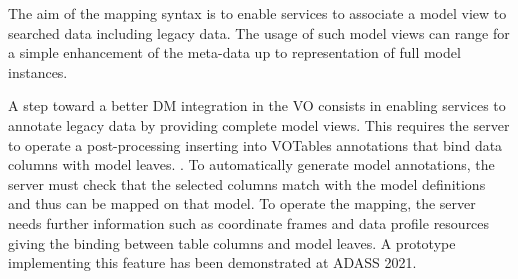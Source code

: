 The aim of the mapping syntax is to enable services to associate a model view to searched data including legacy data.
The usage of such model views can range for a simple enhancement of the meta-data up to representation of full model instances.

A step toward a better DM integration in the VO consists in enabling services to annotate
legacy data by providing complete model
views. This requires the server to operate a post-processing inserting into VOTables
annotations that bind data columns with model leaves. .
To automatically generate model annotations, the server must check that the selected columns 
match with the model definitions and thus can be
mapped on that model. To operate the mapping, the server needs further information
such as coordinate frames and data profile resources giving the binding between table
columns and model leaves. A prototype \citep{2201.01732} implementing this feature
has been demonstrated at ADASS 2021.


